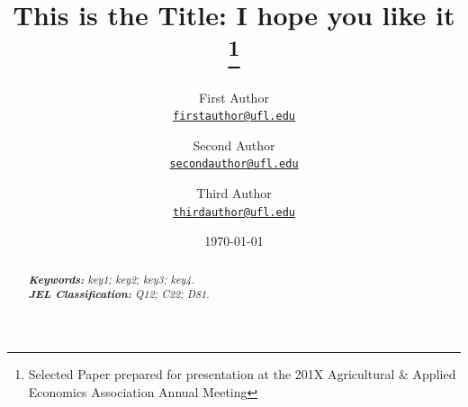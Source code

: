 \documentclass[11pt]{article}
\title{This is the Title: I hope you like it
\thanks{Selected Paper prepared for presentation at the 201X Agricultural \& Applied Economics Association Annual Meeting}
}
\author{First Author\\%
    \href{mailto:firstauthor@ufl.edu}{\texttt{firstauthor@ufl.edu}} %
\and Second Author\\%
    \href{mailto:secondauthor@ufl.edu}{\texttt{secondauthor@ufl.edu}} %
\and Third Author\\%
    \href{mailto:thirdauthor@ufl.edu}{\texttt{thirdauthor@ufl.edu}}%
    }
\date{\today}
\begin{document}
{
\maketitle
\begin{abstract}

    \lipsum[1] %

    \noindent
    \textit{\textbf{Keywords: }%
        key1; key2; key3; key4.} \\ %
    \noindent
    \textit{\textbf{JEL Classification: }%
        Q12; C22; D81.} %

\end{abstract}
}








\medskip



\newpage

\end{document}
